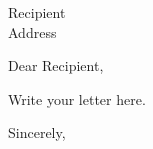 \documentclass{letter}
\begin{document}
\begin{letter}{Recipient \\ Address}
\opening{Dear Recipient,}

Write your letter here.

\closing{Sincerely,}
\end{letter}
\end{document}
